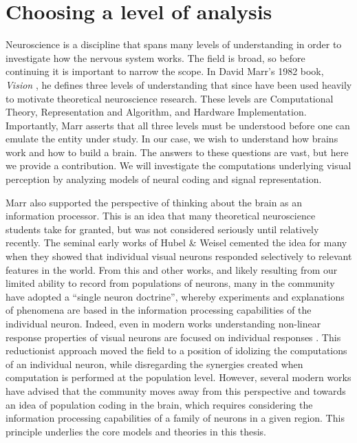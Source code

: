 \section{Choosing a level of analysis}
Neuroscience is a discipline that spans many levels of understanding in order to investigate how the nervous system works. The field is broad, so before continuing it is important to narrow the scope. In David Marr's 1982 book, \textit{Vision} \citealt{marr1982vision}, he defines three levels of understanding that since have been used heavily to motivate theoretical neuroscience research. These levels are Computational Theory, Representation and Algorithm, and Hardware Implementation. Importantly, Marr asserts that all three levels must be understood before one can emulate the entity under study. In our case, we wish to understand how brains work and how to build a brain. The answers to these questions are vast, but here we provide a contribution. We will investigate the computations underlying visual perception by analyzing models of neural coding and signal representation.

Marr also supported the perspective of thinking about the brain as an information processor. This is an idea that many theoretical neuroscience students take for granted, but was not considered seriously until relatively recently. The seminal early works of Hubel & Weisel \citealt{hubel1959receptive} cemented the idea for many when they showed that individual visual neurons responded selectively to relevant features in the world. From this and other works, and likely resulting from our limited ability to record from populations of neurons, many in the community have adopted a ``single neuron doctrine'', whereby experiments and explanations of phenomena are based in the information processing capabilities of the individual neuron. Indeed, even in modern works understanding non-linear response properties of visual neurons are focused on individual responses \cite{placeholder}. This reductionist approach moved the field to a position of idolizing the computations of an individual neuron, while disregarding the synergies created when computation is performed at the population level. However, several modern works have advised that the community moves away from this perspective \cite{barlow1972single, olshausen1999probabilistic, placeholder} and towards an idea of population coding in the brain, which requires considering the information processing capabilities of a family of neurons in a given region. This principle underlies the core models and theories in this thesis.

